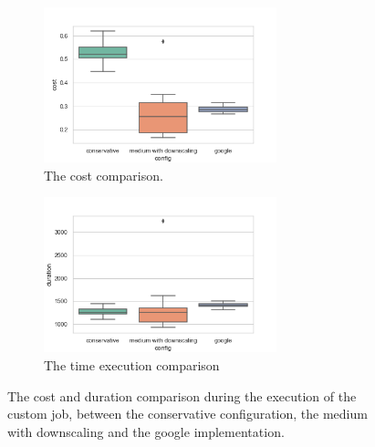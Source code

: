 \documentclass[12pt,twoside,cucitura]{toptesi}
\begin{document}
\begin{figure}
\centering
	\begin{subfigure}[b]{0.4\textwidth}
    \includegraphics[height=45mm]{custom-cost}
	\caption{The cost comparison.}\label{fig:custom-cost}
  \end{subfigure}
	\begin{subfigure}[b]{0.4\textwidth}
	\includegraphics[height=45mm]{custom-duration}
	\caption{The time execution comparison}\label{fig:custom-duration}
	\end{subfigure}
	\caption{The cost and duration comparison during the execution of the custom job, between the conservative configuration, the medium with downscaling and the google implementation.}\label{fig:custom-comparison}
\end{figure}
\end{document}
